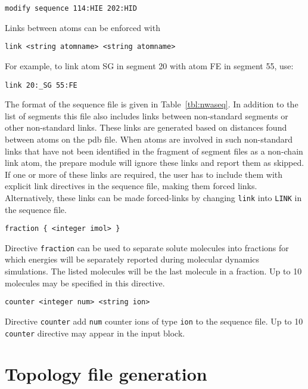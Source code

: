 \begin{verbatim}
modify sequence 114:HIE 202:HID
\end{verbatim}

Links between atoms can be enforced with

\begin{verbatim}
link <string atomname> <string atomname>
\end{verbatim}

For example, to link atom {\rm SG} in segment 20 with atom {\rm FE}
in segment 55, use:

\begin{verbatim}
link 20:_SG 55:FE
\end{verbatim}

\par
The format of the sequence file is given in Table~\ref{tbl:nwaseq}.
In addition to the list of segments this file also includes links
between non-standard segments or other non-standard links. 
These links are generated based on distances found between
atoms on the pdb file. When atoms are involved in such non-standard 
links that have not been identified in the fragment of segment
files as a non-chain link atom, the prepare module will ignore
these links and report them as skipped. If one or more of these links
are required, the user has to include them with explicit link
directives in the sequence file, making them forced links.
Alternatively, these links can be made forced-links by changing 
\verb+link+ into \verb+LINK+ in the sequence file. 

\begin{verbatim}
fraction { <integer imol> }
\end{verbatim}

Directive \verb+fraction+ can be used to separate solute molecules
into fractions for which energies will be separately reported 
during molecular dynamics simulations. The listed molecules will be
the last molecule in a fraction. Up to 10 molecules may be
specified in this directive.

\begin{verbatim}
counter <integer num> <string ion>
\end{verbatim}

Directive \verb+counter+ add \verb+num+ counter ions of type
\verb+ion+ to the sequence file. Up to 10 \verb+counter+
directive may appear in the input block.

\section{Topology file generation}

